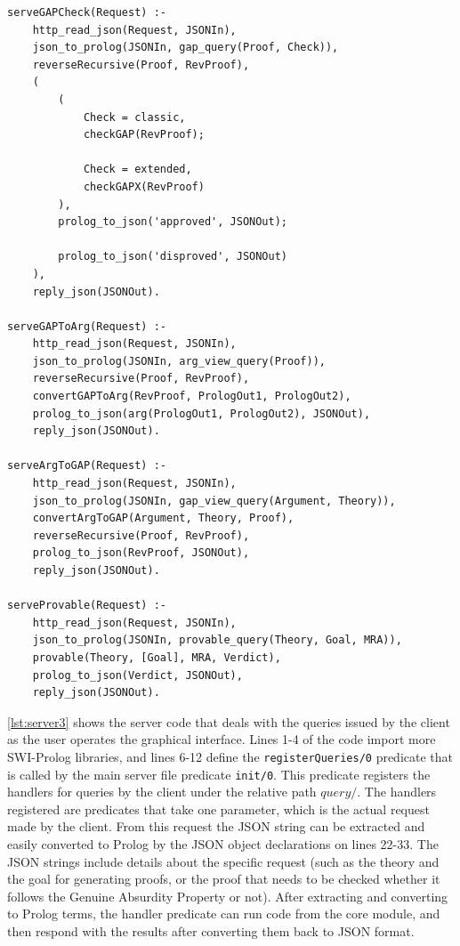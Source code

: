 \documentclass[11pt,twoside,a4paper]{report}
\begin{document}
\begin{lstlisting}[caption={The server code file that registers handlers that server client queries},label=lst:server3]
serveGAPCheck(Request) :-
	http_read_json(Request, JSONIn),
	json_to_prolog(JSONIn, gap_query(Proof, Check)),
	reverseRecursive(Proof, RevProof),
	(
		(
			Check = classic, 
			checkGAP(RevProof);
			
			Check = extended,
			checkGAPX(RevProof)
		),
		prolog_to_json('approved', JSONOut);
		
		prolog_to_json('disproved', JSONOut)
	),
	reply_json(JSONOut).
	
serveGAPToArg(Request) :-
	http_read_json(Request, JSONIn),
	json_to_prolog(JSONIn, arg_view_query(Proof)),
	reverseRecursive(Proof, RevProof),
	convertGAPToArg(RevProof, PrologOut1, PrologOut2),
	prolog_to_json(arg(PrologOut1, PrologOut2), JSONOut),
	reply_json(JSONOut).
	
serveArgToGAP(Request) :-
	http_read_json(Request, JSONIn),
	json_to_prolog(JSONIn, gap_view_query(Argument, Theory)),
	convertArgToGAP(Argument, Theory, Proof),
	reverseRecursive(Proof, RevProof),
	prolog_to_json(RevProof, JSONOut),
	reply_json(JSONOut).
	
serveProvable(Request) :-
	http_read_json(Request, JSONIn),
	json_to_prolog(JSONIn, provable_query(Theory, Goal, MRA)),
	provable(Theory, [Goal], MRA, Verdict),
	prolog_to_json(Verdict, JSONOut),
	reply_json(JSONOut).
\end{lstlisting}

\autoref{lst:server3} shows the server code that deals with the queries issued by the client as the user operates the graphical interface. Lines 1-4 of the code import more SWI-Prolog libraries, and lines 6-12 define the \lstinline$registerQueries/0$ predicate that is called by the main server file predicate \lstinline$init/0$. This predicate registers the handlers for queries by the client under the relative path $query/$. The handlers registered are predicates that take one parameter, which is the actual request made by the client. From this request the JSON string can be extracted and easily converted to Prolog by the JSON object declarations on lines 22-33. The JSON strings include details about the specific request (such as the theory and the goal for generating proofs, or the proof that needs to be checked whether it follows the Genuine Absurdity Property or not). After extracting and converting to Prolog terms, the handler predicate can run code from the core module, and then respond with the results after converting them back to JSON format.
\end{document}
